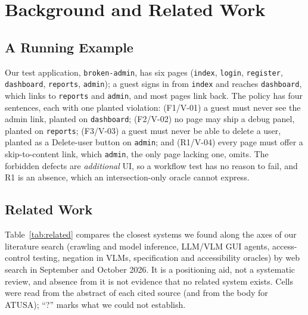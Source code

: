 \section{Background and Related Work}
\label{sec:related}

\subsection{A Running Example}
\label{sec:example}

Our test application, \texttt{broken-admin}, has six pages (\texttt{index},
\texttt{login}, \texttt{register}, \texttt{dashboard}, \texttt{reports},
\texttt{admin}); a guest signs in from \texttt{index} and reaches
\texttt{dashboard}, which links to \texttt{reports} and \texttt{admin}, and most
pages link back. The policy has four sentences, each with one planted violation:
(F1/V-01) a guest must never see the admin link, planted on \texttt{dashboard};
(F2/V-02) no page may ship a debug panel, planted on \texttt{reports};
(F3/V-03) a guest must never be able to delete a user, planted as a Delete-user
button on \texttt{admin}; and (R1/V-04) every page must offer a skip-to-content
link, which \texttt{admin}, the only page lacking one, omits. The forbidden defects
are \emph{additional} UI, so a workflow test has no reason to fail, and R1 is an
absence, which an intersection-only oracle cannot express.

\subsection{Related Work}

Table~\ref{tab:related} compares the closest systems we found along the axes of
our literature search (crawling and model inference, LLM/VLM GUI agents,
access-control testing, negation in VLMs, specification and accessibility
oracles) by web search in September and October 2026. It is a positioning aid, not a systematic review, and absence from it is not
evidence that no related system exists. Cells were read from the abstract of each cited source (and from the
body for ATUSA); ``?'' marks what we could not establish.

